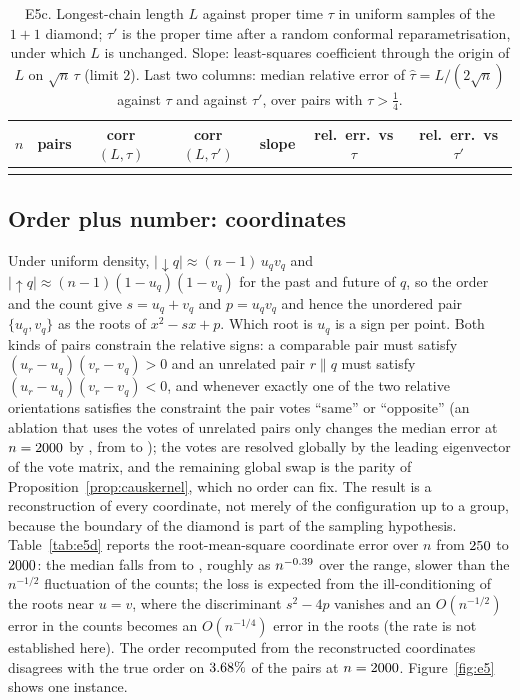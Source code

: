 \documentclass[11pt,a4paper]{article}
\theoremstyle{plain}
\theoremstyle{definition}
\theoremstyle{remark}
\newcommand{\incomp}{\parallel}
\begin{document}
\begin{table}[t]
\centering\small
\begin{tabular}{rrccccc}
\toprule
$n$ & pairs & corr$(L,\tau)$ & corr$(L,\tau')$ & slope & rel.\ err.\ vs $\tau$ & rel.\ err.\ vs $\tau'$\\
\midrule
\\
\bottomrule
\end{tabular}
\caption{E5c. Longest-chain length $L$ against proper time $\tau$ in uniform samples of the $1{+}1$ diamond; $\tau'$ is the proper time after a random conformal reparametrisation, under which $L$ is unchanged. Slope: least-squares coefficient through the origin of $L$ on $\sqrt n\,\tau$ (limit $2$). Last two columns: median relative error of $\hat\tau=L/(2\sqrt n)$ against $\tau$ and against $\tau'$, over pairs with $\tau>\tfrac14$.}
\label{tab:e5c}
\end{table}

\subsection*{Order plus number: coordinates}
Under uniform density, $|{\downarrow}q|\approx (n-1)\,u_qv_q$ and $|{\uparrow}q|\approx(n-1)(1-u_q)(1-v_q)$ for the past and future of $q$, so the order and the count give $s=u_q+v_q$ and $p=u_qv_q$ and hence the unordered pair $\{u_q,v_q\}$ as the roots of $x^2-sx+p$. Which root is $u_q$ is a sign per point. Both kinds of pairs constrain the relative signs: a comparable pair must satisfy $(u_r-u_q)(v_r-v_q)>0$ and an unrelated pair $r\incomp q$ must satisfy $(u_r-u_q)(v_r-v_q)<0$, and whenever exactly one of the two relative orientations satisfies the constraint the pair votes ``same'' or ``opposite'' (an ablation that uses the votes of unrelated pairs only changes the median error at $n=2000$ by \EfiveDablation{}, from \EfiveDrmseLastFour{} to \EfiveDrmseAblLastFour{}); the votes are resolved globally by the leading eigenvector of the vote matrix, and the remaining global swap is the parity of Proposition~\ref{prop:causkernel}, which no order can fix. The result is a reconstruction of every coordinate, not merely of the configuration up to a group, because the boundary of the diamond is part of the sampling hypothesis. Table~\ref{tab:e5d} reports the root-mean-square coordinate error over $n$ from $250$ to $2000$: the median falls from \EfiveDrmseFirst{} to \EfiveDrmseLast{}, roughly as $n^{-0.39}$ over the range, slower than the $n^{-1/2}$ fluctuation of the counts; the loss is expected from the ill-conditioning of the roots near $u=v$, where the discriminant $s^2-4p$ vanishes and an $O(n^{-1/2})$ error in the counts becomes an $O(n^{-1/4})$ error in the roots (the rate is not established here). The order recomputed from the reconstructed coordinates disagrees with the true order on $3.68\%$ of the pairs at $n=2000$. Figure~\ref{fig:e5} shows one instance.
\end{document}
